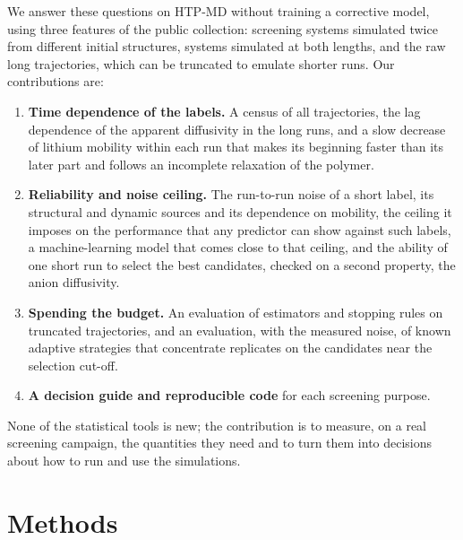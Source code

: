 \documentclass[journal=jcisd8,manuscript=article,email=true]{achemso}
\begin{document}
We answer these questions on HTP-MD without training a corrective model, using three features of
the public collection: \nRep{} screening systems simulated twice from different initial
structures, \nPairs{} systems simulated at both lengths, and the raw long trajectories, which can
be truncated to emulate shorter runs. Our contributions are:
\begin{enumerate}[leftmargin=*,itemsep=2pt]
  \item \textbf{Time dependence of the labels.} A census of all \nTotal{} trajectories, the
        lag dependence of the apparent diffusivity in the long runs, and a slow decrease of lithium
        mobility within each run that makes its beginning faster than its later part and follows
        an incomplete relaxation of the polymer.
  \item \textbf{Reliability and noise ceiling.} The run-to-run noise of a short label, its
        structural and dynamic sources and its dependence on mobility, the ceiling it imposes on
        the performance that any predictor can show against such labels, a machine-learning model
        that comes close to that ceiling, and the ability of one short run to select the best candidates, checked on a
        second property, the anion diffusivity.
  \item \textbf{Spending the budget.} An evaluation of estimators and stopping rules on truncated
        trajectories, and an evaluation, with the measured noise, of known adaptive strategies that
        concentrate replicates on the candidates near the selection cut-off.
  \item \textbf{A decision guide and reproducible code} for each screening purpose.
\end{enumerate}
None of the statistical tools is new; the contribution is to measure, on a real screening
campaign, the quantities they need and to turn them into decisions about how to run and use the
simulations.

\section{Methods}\label{sec:methods}
\end{document}
